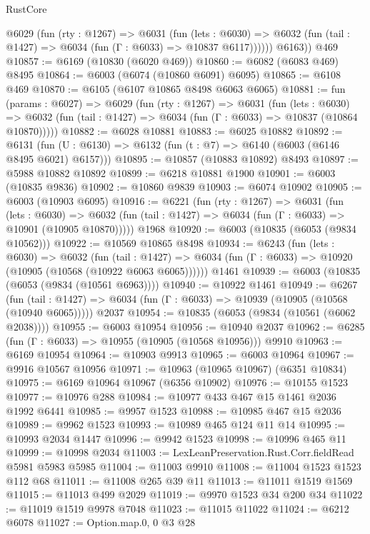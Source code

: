 \begin{lexlean}{RustCore}
\begin{coremodule}
          @6029
            (fun (rty : @1267) =>
            @6031
              (fun (lets : @6030) =>
              @6032 (fun (tail : @1427) => @6034 (fun (Γ : @6033) => @10837 @6117))))))
        @6163))
    @469
@10857 := @6169 (@10830 (@6020 @469))
@10860 := @6082 (@6083 @469) @8495
@10864 := @6003 (@6074 (@10860 @6091) @6095)
@10865 := @6108 @469
@10870 := @6105 (@6107 @10865 @8498 @6063 @6065)
@10881 := fun (params : @6027) =>
  @6029
    (fun (rty : @1267) =>
    @6031
      (fun (lets : @6030) =>
      @6032 (fun (tail : @1427) => @6034 (fun (Γ : @6033) => @10837 (@10864 @10870)))))
@10882 := @6028 @10881
@10883 := @6025 @10882
@10892 := @6131 (fun (U : @6130) => @6132 (fun (t : @7) => @6140 (@6003 (@6146 @8495 @6021) @6157)))
@10895 := @10857 (@10883 @10892) @8493
@10897 := @5988 @10882 @10892
@10899 := @6218 @10881 @1900
@10901 := @6003 (@10835 @9836)
@10902 := @10860 @9839
@10903 := @6074 @10902
@10905 := @6003 (@10903 @6095)
@10916 := @6221
    (fun (rty : @1267) =>
    @6031
      (fun (lets : @6030) =>
      @6032 (fun (tail : @1427) => @6034 (fun (Γ : @6033) => @10901 (@10905 @10870)))))
    @1968
@10920 := @6003 (@10835 (@6053 (@9834 @10562)))
@10922 := @10569 @10865 @8498
@10934 := @6243
    (fun (lets : @6030) =>
    @6032
      (fun (tail : @1427) =>
      @6034 (fun (Γ : @6033) => @10920 (@10905 (@10568 (@10922 @6063 @6065))))))
    @1461
@10939 := @6003 (@10835 (@6053 (@9834 (@10561 @6963))))
@10940 := @10922 @1461
@10949 := @6267
    (fun (tail : @1427) => @6034 (fun (Γ : @6033) => @10939 (@10905 (@10568 (@10940 @6065)))))
    @2037
@10954 := @10835 (@6053 (@9834 (@10561 (@6062 @2038))))
@10955 := @6003 @10954
@10956 := @10940 @2037
@10962 := @6285 (fun (Γ : @6033) => @10955 (@10905 (@10568 @10956))) @9910
@10963 := @6169 @10954
@10964 := @10903 @9913
@10965 := @6003 @10964
@10967 := @9916 @10567 @10956
@10971 := @10963 (@10965 @10967) (@6351 @10834)
@10975 := @6169 @10964 @10967 (@6356 @10902)
@10976 := @10155 @1523
@10977 := @10976 @288
@10984 := @10977 @433 @467 @15 @1461 @2036 @1992 @6441
@10985 := @9957 @1523
@10988 := @10985 @467 @15 @2036
@10989 := @9962 @1523
@10993 := @10989 @465 @124 @11 @14
@10995 := @10993 @2034 @1447
@10996 := @9942 @1523
@10998 := @10996 @465 @11
@10999 := @10998 @2034
@11003 := LexLeanPreservation.Rust.Corr.fieldRead @5981 @5983 @5985
@11004 := @11003 @9910
@11008 := @11004 @1523 @1523 @112 @68
@11011 := @11008 @265 @39 @11
@11013 := @11011 @1519 @1569
@11015 := @11013 @499 @2029
@11019 := @9970 @1523 @34 @200 @34
@11022 := @11019 @1519 @9978 @7048
@11023 := @11015 @11022
@11024 := @6212 @6078
@11027 := Option.map.{0, 0} @3 @28

\end{coremodule}
\end{lexlean}
